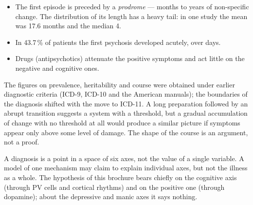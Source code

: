 \begin{itemize}
\item The first episode is preceded by a \emph{prodrome} --- months to years of non-specific change. The distribution of its length has a heavy tail: in one study the mean was 17.6 months and the median 4.\tS
\item In 43.7\,\% of patients the first psychosis developed acutely, over days.\tS
\item Drugs (antipsychotics) attenuate the positive symptoms and act little on the negative and cognitive ones.\tU
\end{itemize}
\begin{note}
The figures on prevalence, heritability and course were obtained under earlier diagnostic criteria (ICD-9, ICD-10 and the American manuals); the boundaries of the diagnosis shifted with the move to ICD-11. A long preparation followed by an abrupt transition suggests a system with a threshold, but a gradual accumulation of change with no threshold at all would produce a similar picture if symptoms appear only above some level of damage. The shape of the course is an argument, not a proof.
\end{note}
\begin{ineq}
A diagnosis is a point in a space of six axes, not the value of a single variable. A model of one mechanism may claim to explain individual axes, but not the illness as a whole. The hypothesis of this brochure bears chiefly on the cognitive axis (through PV cells and cortical rhythms) and on the positive one (through dopamine); about the depressive and manic axes it says nothing.
\end{ineq}
